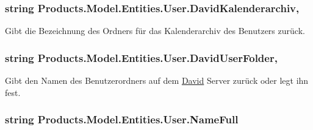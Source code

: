 \subsubsection[{\texorpdfstring{David\+Kalenderarchiv}{DavidKalenderarchiv}}]{\setlength{\rightskip}{0pt plus 5cm}string Products.\+Model.\+Entities.\+User.\+David\+Kalenderarchiv\hspace{0.3cm}{\ttfamily [get]}, {\ttfamily [set]}}\hypertarget{class_products_1_1_model_1_1_entities_1_1_user_aa40e7b706636f5b09aa2431058efb490}{}\label{class_products_1_1_model_1_1_entities_1_1_user_aa40e7b706636f5b09aa2431058efb490}


Gibt die Bezeichnung des Ordners für das Kalenderarchiv des Benutzers zurück. 

\subsubsection[{\texorpdfstring{David\+User\+Folder}{DavidUserFolder}}]{\setlength{\rightskip}{0pt plus 5cm}string Products.\+Model.\+Entities.\+User.\+David\+User\+Folder\hspace{0.3cm}{\ttfamily [get]}, {\ttfamily [set]}}\hypertarget{class_products_1_1_model_1_1_entities_1_1_user_a95c0af472366c2b414e191193d9e0274}{}\label{class_products_1_1_model_1_1_entities_1_1_user_a95c0af472366c2b414e191193d9e0274}


Gibt den Namen des Benutzerordners auf dem \hyperlink{namespace_david}{David} Server zurück oder legt ihn fest. 

\subsubsection[{\texorpdfstring{Name\+Full}{NameFull}}]{\setlength{\rightskip}{0pt plus 5cm}string Products.\+Model.\+Entities.\+User.\+Name\+Full\hspace{0.3cm}{\ttfamily [get]}}\hypertarget{class_products_1_1_model_1_1_entities_1_1_user_aba724ae4c5bcc21396b6046d67bc5a9b}{}\label{class_products_1_1_model_1_1_entities_1_1_user_aba724ae4c5bcc21396b6046d67bc5a9b}


